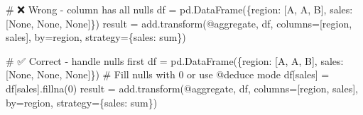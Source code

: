 \documentclass[
  letterpaper,
]{scrbook}
\newenvironment{Shaded}{\begin{snugshade}}{\end{snugshade}}
\newcommand{\CommentTok}[1]{\textcolor[rgb]{0.37,0.37,0.37}{#1}}
\newcommand{\DecValTok}[1]{\textcolor[rgb]{0.68,0.00,0.00}{#1}}
\newcommand{\NormalTok}[1]{\textcolor[rgb]{0.00,0.23,0.31}{#1}}
\newcommand{\OperatorTok}[1]{\textcolor[rgb]{0.37,0.37,0.37}{#1}}
\newcommand{\StringTok}[1]{\textcolor[rgb]{0.13,0.47,0.30}{#1}}
\newcommand{\VariableTok}[1]{\textcolor[rgb]{0.07,0.07,0.07}{#1}}
\begin{document}
\begin{Shaded}
\begin{Highlighting}[]
\CommentTok{\# ❌ Wrong {-} column has all nulls}
\NormalTok{df }\OperatorTok{=}\NormalTok{ pd.DataFrame(\{}\StringTok{\textquotesingle{}region\textquotesingle{}}\NormalTok{: [}\StringTok{\textquotesingle{}A\textquotesingle{}}\NormalTok{, }\StringTok{\textquotesingle{}A\textquotesingle{}}\NormalTok{, }\StringTok{\textquotesingle{}B\textquotesingle{}}\NormalTok{], }\StringTok{\textquotesingle{}sales\textquotesingle{}}\NormalTok{: [}\VariableTok{None}\NormalTok{, }\VariableTok{None}\NormalTok{, }\VariableTok{None}\NormalTok{]\})}
\NormalTok{result }\OperatorTok{=}\NormalTok{ add.transform(}\StringTok{\textquotesingle{}@aggregate\textquotesingle{}}\NormalTok{, df, columns}\OperatorTok{=}\NormalTok{[}\StringTok{\textquotesingle{}region\textquotesingle{}}\NormalTok{, }\StringTok{\textquotesingle{}sales\textquotesingle{}}\NormalTok{], }
\NormalTok{                       by}\OperatorTok{=}\StringTok{\textquotesingle{}region\textquotesingle{}}\NormalTok{, strategy}\OperatorTok{=}\NormalTok{\{}\StringTok{\textquotesingle{}sales\textquotesingle{}}\NormalTok{: }\StringTok{\textquotesingle{}sum\textquotesingle{}}\NormalTok{\})}

\CommentTok{\# ✅ Correct {-} handle nulls first}
\NormalTok{df }\OperatorTok{=}\NormalTok{ pd.DataFrame(\{}\StringTok{\textquotesingle{}region\textquotesingle{}}\NormalTok{: [}\StringTok{\textquotesingle{}A\textquotesingle{}}\NormalTok{, }\StringTok{\textquotesingle{}A\textquotesingle{}}\NormalTok{, }\StringTok{\textquotesingle{}B\textquotesingle{}}\NormalTok{], }\StringTok{\textquotesingle{}sales\textquotesingle{}}\NormalTok{: [}\VariableTok{None}\NormalTok{, }\VariableTok{None}\NormalTok{, }\VariableTok{None}\NormalTok{]\})}
\CommentTok{\# Fill nulls with 0 or use @deduce mode}
\NormalTok{df[}\StringTok{\textquotesingle{}sales\textquotesingle{}}\NormalTok{] }\OperatorTok{=}\NormalTok{ df[}\StringTok{\textquotesingle{}sales\textquotesingle{}}\NormalTok{].fillna(}\DecValTok{0}\NormalTok{)}
\NormalTok{result }\OperatorTok{=}\NormalTok{ add.transform(}\StringTok{\textquotesingle{}@aggregate\textquotesingle{}}\NormalTok{, df, columns}\OperatorTok{=}\NormalTok{[}\StringTok{\textquotesingle{}region\textquotesingle{}}\NormalTok{, }\StringTok{\textquotesingle{}sales\textquotesingle{}}\NormalTok{], }
\NormalTok{                       by}\OperatorTok{=}\StringTok{\textquotesingle{}region\textquotesingle{}}\NormalTok{, strategy}\OperatorTok{=}\NormalTok{\{}\StringTok{\textquotesingle{}sales\textquotesingle{}}\NormalTok{: }\StringTok{\textquotesingle{}sum\textquotesingle{}}\NormalTok{\})}
\end{Highlighting}
\end{Shaded}
\end{document}
